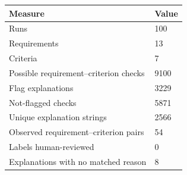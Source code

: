 \begin{tabular}{ll}
\hline
Measure & Value \\
\hline
Runs & 100 \\
Requirements & 13 \\
Criteria & 7 \\
Possible requirement–criterion checks & 9100 \\
Flag explanations & 3229 \\
Not-flagged checks & 5871 \\
Unique explanation strings & 2566 \\
Observed requirement–criterion pairs & 54 \\
Labels human-reviewed & 0 \\
Explanations with no matched reason & 8 \\
\hline
\end{tabular}
